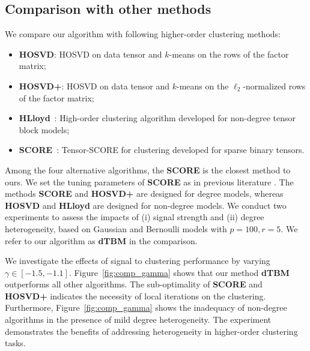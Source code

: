 \documentclass[journal]{IEEEtran}
\theoremstyle{definition}
\theoremstyle{definition}
\begin{document}
\subsection{Comparison with other methods}\label{subsec:comp}

We compare our algorithm with following higher-order clustering methods:
\begin{itemize}[wide,topsep=-3pt,itemsep=0pt,parsep=1pt]
    \item \textbf{\small HOSVD}: HOSVD on data tensor and $k$-means on the rows of the factor matrix;
    \item \textbf{\small HOSVD+}: HOSVD on data tensor and $k$-means on the $\ell_2$-normalized rows of the factor matrix;
    \item \textbf{\small HLloyd}~\citep{han2020exact}: High-order clustering algorithm developed for non-degree tensor block models;
    \item \textbf{\small SCORE}~\citep{ke2019community}: Tensor-SCORE for clustering developed for sparse binary tensors.
\end{itemize}

Among the four alternative algorithms, the \textbf{\small SCORE} is the closest method to ours. We set the tuning parameters of \textbf{\small SCORE} as in previous literature \citep{ke2019community}. The methods \textbf{\small SCORE} and \textbf{\small HOSVD+} are designed for degree models, whereas \textbf{\small HOSVD} and \textbf{\small HLloyd} are designed for non-degree models. We conduct two experiments to assess the impacts of (i) signal strength and (ii) degree heterogeneity, based on Gaussian and Bernoulli models with $ p = 100, r = 5$. We refer to our algorithm as \textbf{\small dTBM} in the comparison. 

We investigate the effects of signal to clustering performance by varying $\gamma \in [-1.5, -1.1]$. Figure~\ref{fig:comp_gamma} shows that our method \textbf{\small dTBM} outperforms all other algorithms. The sub-optimality of \textbf{\small SCORE} and \textbf{\small HOSVD+} indicates the necessity of local iterations on the clustering. Furthermore,  Figure~\ref{fig:comp_gamma} shows the inadequacy of non-degree algorithms in the presence of mild degree heterogeneity. 
The experiment demonstrates the benefits of addressing heterogeneity in higher-order clustering tasks.   
\end{document}

